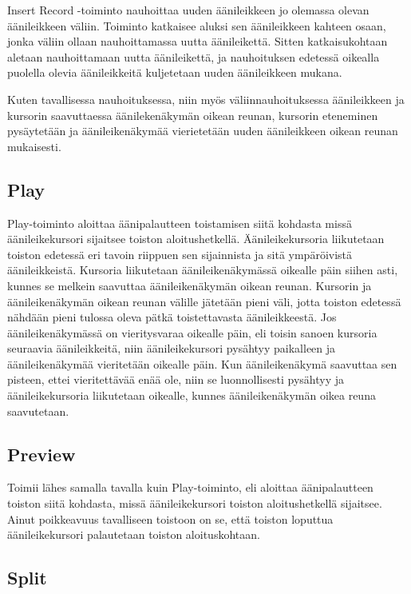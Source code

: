 \documentclass[utf8]{gradu3}
\begin{document}
Insert Record -toiminto nauhoittaa uuden äänileikkeen jo olemassa olevan äänileikkeen väliin. Toiminto katkaisee aluksi sen äänileikkeen kahteen osaan, jonka väliin ollaan nauhoittamassa uutta äänileikettä. Sitten katkaisukohtaan aletaan nauhoittamaan uutta äänileikettä, ja nauhoituksen edetessä oikealla puolella olevia äänileikkeitä kuljetetaan uuden äänileikkeen mukana. 

Kuten tavallisessa nauhoituksessa, niin myös väliinnauhoituksessa äänileikkeen ja kursorin saavuttaessa äänilekenäkymän oikean reunan, kursorin eteneminen pysäytetään ja äänileikenäkymää vierietetään uuden äänileikkeen oikean reunan mukaisesti.

\subsection{Play}

Play-toiminto aloittaa äänipalautteen toistamisen siitä kohdasta missä äänileikekursori sijaitsee toiston aloitushetkellä. Äänileikekursoria liikutetaan toiston edetessä eri tavoin riippuen sen sijainnista ja sitä ympäröivistä äänileikkeistä. Kursoria liikutetaan äänileikenäkymässä oikealle päin siihen asti, kunnes se melkein saavuttaa äänileikenäkymän oikean reunan. Kursorin ja äänileikenäkymän oikean reunan välille jätetään pieni väli, jotta toiston edetessä nähdään pieni tulossa oleva pätkä toistettavasta äänileikkeestä. Jos äänileikenäkymässä on vieritysvaraa oikealle päin, eli toisin sanoen kursoria seuraavia äänileikkeitä, niin äänileikekursori pysähtyy paikalleen ja äänileikenäkymää vieritetään oikealle päin. Kun äänileikenäkymä saavuttaa sen pisteen, ettei vieritettävää enää ole, niin se luonnollisesti pysähtyy ja äänileikekursoria liikutetaan oikealle, kunnes äänileikenäkymän oikea reuna saavutetaan.
 

\subsection{Preview}

Toimii lähes samalla tavalla kuin Play-toiminto, eli aloittaa äänipalautteen toiston siitä kohdasta, missä äänileikekursori toiston aloitushetkellä sijaitsee. Ainut poikkeavuus tavalliseen toistoon on se, että toiston loputtua äänileikekursori palautetaan toiston aloituskohtaan. 

\subsection{Split}
\end{document}
